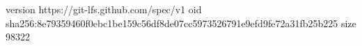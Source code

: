 version https://git-lfs.github.com/spec/v1
oid sha256:8e79359460f0ebc1be159c56df8de07cc5973526791e9efd9fe72a31fb25b225
size 98322
